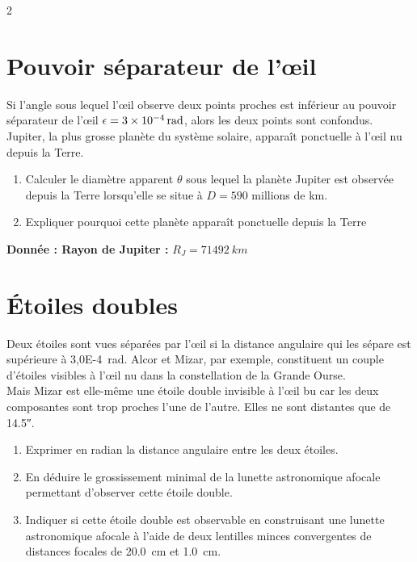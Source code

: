 \documentclass[a4paper,11pt,fleqn]{article}%
\begin{document}
\begin{multicols}{2}
\section{Pouvoir séparateur de l'\oe il}
Si l'angle sous lequel l'\oe il observe deux points proches est inférieur au pouvoir séparateur de l'\oe il $\epsilon = \SI{3E-4}{\radian }$, alors les deux points sont confondus.\\
Jupiter, la plus grosse planète du système solaire, apparaît ponctuelle à l'\oe il nu depuis la Terre.
\begin{enumerate}
    \item Calculer le diamètre apparent $\theta$ sous lequel la planète Jupiter est observée depuis la Terre lorsqu'elle se situe à $D = \num{590}$ millions de km.
    \item Expliquer pourquoi cette planète apparaît ponctuelle depuis la Terre
\end{enumerate}
\textbf{Donnée : Rayon de Jupiter :} $R_J = \SI{71492}{km}$

\section{Étoiles doubles}
Deux étoiles sont vues séparées par l'\oe il si la distance angulaire qui les sépare est supérieure à \SI{3,0E-4}{\radian}. Alcor et Mizar, par exemple, constituent un couple d'étoiles visibles à l'\oe il nu dans la constellation de la Grande Ourse.\\
Mais Mizar est elle-même une étoile double invisible à l'\oe il bu car les deux composantes sont trop proches l'une de l'autre. Elles ne sont distantes que de \ang{;;14.5}.
\begin{enumerate}
    \item Exprimer en radian la distance angulaire entre les deux étoiles.
    \item En déduire le grossissement minimal de la lunette astronomique afocale permettant d'observer cette étoile double.
    \item Indiquer si cette étoile double est observable en construisant une lunette astronomique afocale à l'aide de deux lentilles minces convergentes de distances focales de \SI{20.0}{cm} et \SI{1,0}{cm}.
\end{enumerate}


\end{multicols}
\end{document}
